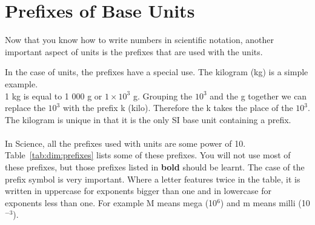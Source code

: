 \section{Prefixes of Base Units}
Now that you know how to write numbers in scientific notation, another important aspect of units is the prefixes that are used with the units. 


In the case of units, the prefixes have a special use. The kilogram (kg) is a simple example.\\ 1 kg is equal to 1 000 g or $1\times 10^3$ g. Grouping the $10^3$ and the g together we can replace the $10^3$ with the prefix k (kilo). Therefore the k takes the place of the $10^3$. \\
The kilogram is unique in that it is the only SI base unit containing a prefix.\\
\\
In Science, all the prefixes used with units are some power of 10. Table~\ref{tab:dim:prefixes} lists some of these prefixes. You will not use most of these prefixes, but those prefixes listed in \textbf{bold} should be learnt. The case of the prefix symbol is very important. Where a letter features twice in the table, it is written in uppercase for exponents bigger than one and in lowercase for exponents less than one. For example M means mega (10$^6$) and m means milli (10$^{-3}$).

